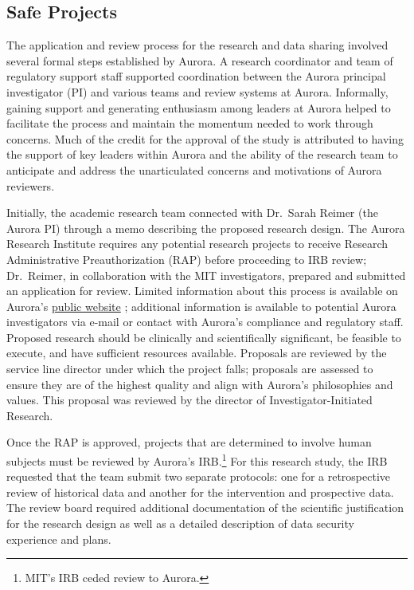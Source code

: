 \hypertarget{safe-projects-3}{%
\subsection{Safe Projects}\label{safe-projects-3}}

The application and review process for the research and data sharing involved several formal steps established by Aurora. A research coordinator and team of regulatory support staff supported coordination between the Aurora principal investigator (PI) and various teams and review systems at Aurora. Informally, gaining support and generating enthusiasm among leaders at Aurora helped to facilitate the process and maintain the momentum needed to work through concerns. Much of the credit for the approval of the study is attributed to having the support of key leaders within Aurora and the ability of the research team to anticipate and address the unarticulated concerns and motivations of Aurora reviewers.

Initially, the academic research team connected with Dr.~Sarah Reimer (the Aurora PI) through a memo describing the proposed research design. The Aurora Research Institute requires any potential research projects to receive Research Administrative Preauthorization (RAP) before proceeding to IRB review; Dr.~Reimer, in collaboration with the MIT investigators, prepared and submitted an application for review. Limited information about this process is available on Aurora's \href{https://www.aurorahealthcare.org/aurora-research-institute/researcher-resources/research-administrative-preauthorization\#Overview}{public website} \citep{aurorahealthcare}; additional information is available to potential Aurora investigators via e-mail or contact with Aurora's compliance and regulatory staff. Proposed research should be clinically and scientifically significant, be feasible to execute, and have sufficient resources available. Proposals are reviewed by the service line director under which the project falls; proposals are assessed to ensure they are of the highest quality and align with Aurora's philosophies and values. This proposal was reviewed by the director of Investigator-Initiated Research.

Once the RAP is approved, projects that are determined to involve human subjects must be reviewed by Aurora's IRB.\footnote{MIT's IRB ceded review to Aurora.} For this research study, the IRB requested that the team submit two separate protocols: one for a retrospective review of historical data and another for the intervention and prospective data. The review board required additional documentation of the scientific justification for the research design as well as a detailed description of data security experience and plans.

